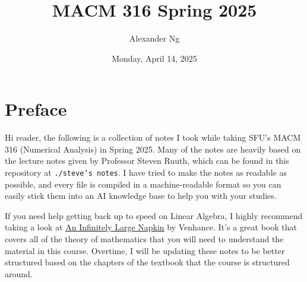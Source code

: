 \documentclass[12pt]{book}
\newcommand{\ulhref}[2]{\href{#1}{\color{blue}\uline{#2}}}
\begin{document}
\title{MACM 316 Spring 2025}
\author{Alexander Ng}
\date{Monday, April 14, 2025}

\maketitle

\section{Preface}

Hi reader, the following is a collection of notes I took while taking SFU's MACM
316 (Numerical Analysis) in Spring 2025. Many of the notes are heavily based on
the lecture notes given by Professor Steven Ruuth, which can be found in this
repository at \texttt{./steve's notes}. I have tried to make the notes as
readable as possible, and every file is compiled in a machine-readable format so
you can easily stick them into an AI knowledge base to help you with your
studies.

If you need help getting back up to speed on Linear Algebra, I highly recommend
taking a look at \ulhref{https://venhance.github.io/napkin/Napkin.pdf#part.4}{An Infinitely Large Napkin} by Venhance. It's a great book that covers all of the
theory of mathematics that you will need to understand the material in this
course.
Overtime, I will be updating these notes to be better structured based on the
chapters of the textbook that the course is structured around.







































\end{document}
